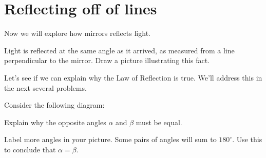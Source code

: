 \documentclass[handout,noauthor,nooutcomes]{ximera}
\begin{document}
\section{Reflecting off of lines}


Now we will explore how mirrors reflects light.

\begin{fact}
  Light is reflected at the same angle as it arrived, as
  measured from a line perpendicular to the mirror. Draw a picture
  illustrating this fact. 
\end{fact}

Let's see if we can explain why the Law of Reflection is true. We'll
address this in the next several problems.


\begin{problem}
  Consider the following diagram:
  \begin{image}
  \end{image}
  Explain why the opposite angles $\alpha$ and $\beta$ must be
  equal.
  \begin{hint}
    Label more angles in your picture. Some pairs of angles will sum
    to $180^\circ$. Use this to conclude that $\alpha = \beta$.
  \end{hint}
\end{problem}
\end{document}
